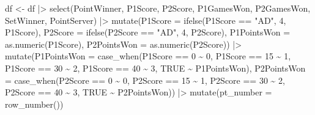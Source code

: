 \documentclass[
  letterpaper,
  DIV=11,
  numbers=noendperiod]{scrartcl}
\newenvironment{Shaded}{\begin{snugshade}}{\end{snugshade}}
\newcommand{\AttributeTok}[1]{\textcolor[rgb]{0.40,0.45,0.13}{#1}}
\newcommand{\ConstantTok}[1]{\textcolor[rgb]{0.56,0.35,0.01}{#1}}
\newcommand{\DecValTok}[1]{\textcolor[rgb]{0.68,0.00,0.00}{#1}}
\newcommand{\FunctionTok}[1]{\textcolor[rgb]{0.28,0.35,0.67}{#1}}
\newcommand{\NormalTok}[1]{\textcolor[rgb]{0.00,0.23,0.31}{#1}}
\newcommand{\OtherTok}[1]{\textcolor[rgb]{0.00,0.23,0.31}{#1}}
\newcommand{\SpecialCharTok}[1]{\textcolor[rgb]{0.37,0.37,0.37}{#1}}
\newcommand{\StringTok}[1]{\textcolor[rgb]{0.13,0.47,0.30}{#1}}
\begin{document}
\begin{Shaded}
\begin{Highlighting}[]
\NormalTok{  df }\OtherTok{\textless{}{-}}\NormalTok{ df }\SpecialCharTok{|\textgreater{}} \FunctionTok{select}\NormalTok{(PointWinner,}
\NormalTok{                     P1Score,}
\NormalTok{                     P2Score,}
\NormalTok{                     P1GamesWon,}
\NormalTok{                     P2GamesWon,}
\NormalTok{                     SetWinner,}
\NormalTok{                     PointServer) }\SpecialCharTok{|\textgreater{}}
    \FunctionTok{mutate}\NormalTok{(}\AttributeTok{P1Score =} \FunctionTok{ifelse}\NormalTok{(P1Score }\SpecialCharTok{==} \StringTok{"AD"}\NormalTok{, }\DecValTok{4}\NormalTok{, P1Score),}
           \AttributeTok{P2Score =} \FunctionTok{ifelse}\NormalTok{(P2Score }\SpecialCharTok{==} \StringTok{"AD"}\NormalTok{, }\DecValTok{4}\NormalTok{, P2Score),}
           \AttributeTok{P1PointsWon =} \FunctionTok{as.numeric}\NormalTok{(P1Score),}
           \AttributeTok{P2PointsWon =} \FunctionTok{as.numeric}\NormalTok{(P2Score)) }\SpecialCharTok{|\textgreater{}}
    \FunctionTok{mutate}\NormalTok{(}\AttributeTok{P1PointsWon =} \FunctionTok{case\_when}\NormalTok{(P1Score }\SpecialCharTok{==} \DecValTok{0} \SpecialCharTok{\textasciitilde{}} \DecValTok{0}\NormalTok{,}
\NormalTok{                                   P1Score }\SpecialCharTok{==} \DecValTok{15} \SpecialCharTok{\textasciitilde{}} \DecValTok{1}\NormalTok{,}
\NormalTok{                                   P1Score }\SpecialCharTok{==} \DecValTok{30} \SpecialCharTok{\textasciitilde{}} \DecValTok{2}\NormalTok{,}
\NormalTok{                                   P1Score }\SpecialCharTok{==} \DecValTok{40} \SpecialCharTok{\textasciitilde{}} \DecValTok{3}\NormalTok{,}
                                   \ConstantTok{TRUE} \SpecialCharTok{\textasciitilde{}}\NormalTok{ P1PointsWon),}
           \AttributeTok{P2PointsWon =} \FunctionTok{case\_when}\NormalTok{(P2Score }\SpecialCharTok{==} \DecValTok{0} \SpecialCharTok{\textasciitilde{}} \DecValTok{0}\NormalTok{,}
\NormalTok{                                   P2Score }\SpecialCharTok{==} \DecValTok{15} \SpecialCharTok{\textasciitilde{}} \DecValTok{1}\NormalTok{,}
\NormalTok{                                   P2Score }\SpecialCharTok{==} \DecValTok{30} \SpecialCharTok{\textasciitilde{}} \DecValTok{2}\NormalTok{,}
\NormalTok{                                   P2Score }\SpecialCharTok{==} \DecValTok{40} \SpecialCharTok{\textasciitilde{}} \DecValTok{3}\NormalTok{,}
                                   \ConstantTok{TRUE} \SpecialCharTok{\textasciitilde{}}\NormalTok{ P2PointsWon)) }\SpecialCharTok{|\textgreater{}}
    \FunctionTok{mutate}\NormalTok{(}\AttributeTok{pt\_number =} \FunctionTok{row\_number}\NormalTok{())}
  

\end{Highlighting}
\end{Shaded}
\end{document}
